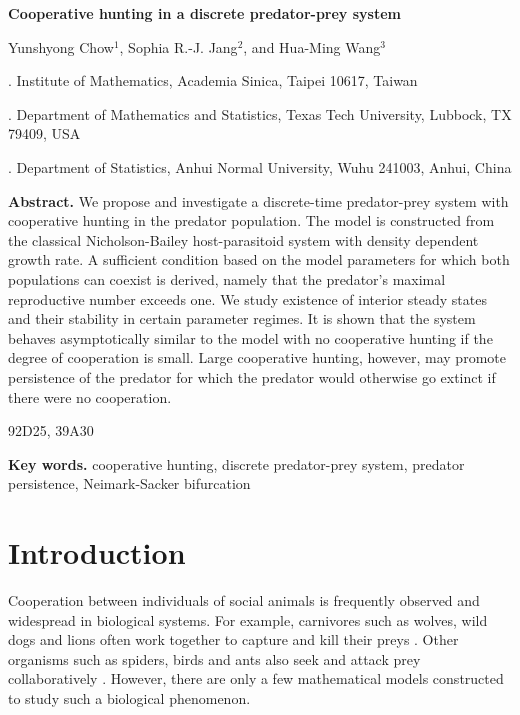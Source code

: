 \documentclass[11pt]{article}
\def\LARGE{\Large}
\def\Large{\large}
\begin{document}
\begin{center}
{\LARGE{\bf {\Large Cooperative hunting in a discrete
predator-prey system}}}
\end{center}

\begin{center} Yunshyong Chow$^1$,   Sophia R.-J.  Jang$^2$, and
Hua-Ming Wang$^3$ \end{center}

. Institute of Mathematics, Academia Sinica, Taipei
10617, Taiwan


. Department of Mathematics and Statistics, Texas Tech
University, Lubbock, TX 79409, USA


. Department of Statistics, Anhui Normal University,
Wuhu 241003, Anhui, China


\vspace{0.1in}


\noindent\textbf{Abstract.} We propose and investigate a
discrete-time predator-prey system with cooperative hunting in the
predator population. The model is constructed from the classical
Nicholson-Bailey host-parasitoid system with density dependent
growth rate. A sufficient condition based on the model parameters
for which both populations can coexist is derived, namely that the
predator's maximal reproductive number exceeds one. We study
existence of interior steady states and their stability in certain
parameter regimes. It is shown that the system behaves
asymptotically similar to the model with no cooperative hunting if
the degree of cooperation is small. Large cooperative hunting,
however,  may promote persistence of the predator for which the
predator would otherwise go extinct if there were no cooperation.

\vspace{0.1in}

  92D25,
39A30


\vspace{0.1in}


\noindent\textbf{Key words.} cooperative hunting, discrete
predator-prey system, predator persistence, Neimark-Sacker
bifurcation


\section{Introduction}
Cooperation between individuals of  social animals is frequently
observed and widespread in biological systems. For example,
carnivores such as wolves, wild dogs and lions   often work
together to capture and kill their preys \cite{scheel}. Other
organisms such as spiders, birds and ants also seek and  attack
prey collaboratively \cite{uetz}. However, there are only a few
mathematical models constructed to study such a biological
phenomenon.
\end{document}
